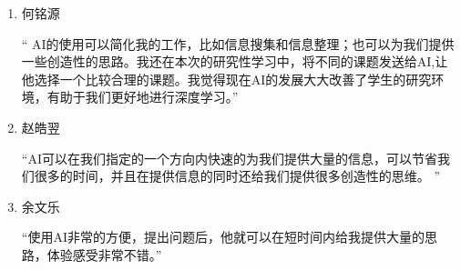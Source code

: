 \begin{enumerate}
    \item 何铭源

    `` AI的使用可以简化我的工作，比如信息搜集和信息整理；也可以为我们提供一些创造性的思路。我还在本次的研究性学习中，将不同的课题发送给AI,让他选择一个比较合理的课题。我觉得现在AI的发展大大改善了学生的研究环境，有助于我们更好地进行深度学习。''

    \item 赵皓翌

    ``AI可以在我们指定的一个方向内快速的为我们提供大量的信息，可以节省我们很多的时间，并且在提供信息的同时还给我们提供很多创造性的思维。 ''

    \item 余文乐

    ``使用AI非常的方便，提出问题后，他就可以在短时间内给我提供大量的思路，体验感受非常不错。''

\end{enumerate}